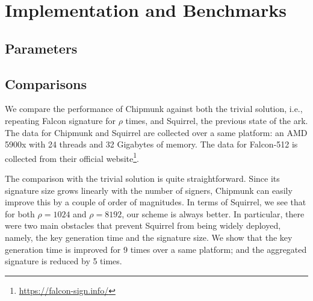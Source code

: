 \section{Implementation and Benchmarks}
\subsection{Parameters}

% 
\subsection{Comparisons}\label{ss:comparison}

We compare the performance of Chipmunk against both the trivial solution, i.e., repeating Falcon signature for $\rho$ times, and
Squirrel, the previous state of the ark. The data for Chipmunk and Squirrel are collected over a same platform: an AMD 5900x with 24 threads
and 32 Gigabytes of memory. The data for Falcon-512 is collected from their official website\footnote{\url{https://falcon-sign.info/}}.

The comparison with the trivial solution is quite straightforward. Since its signature size grows linearly with the number of signers,
Chipmunk can easily improve this by a couple of order of magnitudes.
In terms of Squirrel, we see that for both $\rho = 1024$ and $\rho = 8192$, our scheme is always better. 
In particular, there were two main obstacles that prevent Squirrel from being widely deployed, namely, the key generation time
and the signature size. We show that the key generation time is improved for 9 times over a same platform; and the 
aggregated signature is reduced by 5 times. 

